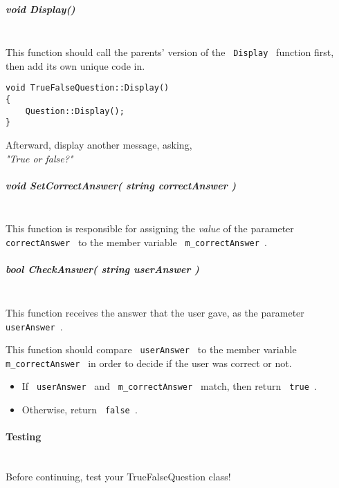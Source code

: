\documentclass[a4paper,12pt]{book}
\begin{document}
                        \subparagraph{ void Display() } ~\\

                            This function should call the parents' version of
                            the \texttt{ Display } function first, then add
                            its own unique code in.
                            
\begin{lstlisting}[style=code]
void TrueFalseQuestion::Display()
{
    Question::Display();
}
\end{lstlisting}
                            Afterward, display another message, asking, \\
                            \textit{ "True or false?" }

                        \newpage
                        \subparagraph{ void SetCorrectAnswer( string correctAnswer ) }  ~\\

                            This function is responsible for assigning the \textit{ value }
                            of the parameter \texttt{ correctAnswer } to the member variable
                            \texttt{ m\_correctAnswer }.


                        \subparagraph{ bool CheckAnswer( string userAnswer ) } ~\\

                            This function receives the answer that the user gave,
                            as the parameter \texttt{ userAnswer }.

                            This function should compare \texttt{ userAnswer } to
                            the member variable \texttt{ m\_correctAnswer } in order
                            to decide if the user was correct or not.

                            \begin{itemize}
                                \item If \texttt{ userAnswer } and \texttt{ m\_correctAnswer } match, then return \texttt{ true }.
                                \item Otherwise, return \texttt{ false }.
                            \end{itemize}
                        
                    \paragraph{ Testing } ~\\
                        Before continuing, test your TrueFalseQuestion class!
\end{document}
